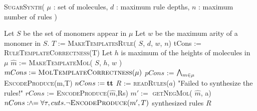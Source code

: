 \begin{algorithm}[t]
  \caption{ \textsc{SugarSynth}( $\mu$ : set of molecules, $d$ : maximum rule depths, $n$ : maximum number of rules )}
  \label{alg:sugar-synth}
  \begin{algorithmic}[1]
  \State Let $S$ be the set of monomers appear in $\mu$
  \State Let $w$ be the maximum arity of a monomer in $S$.
  \State $T$ := \textsc{MakeTemplatesRule}( $S$, $d$, $w$, $n$)
  \label{line:createRtemp}
  \State tCons := \textsc{RuleTemplateCorrectness}(T)
  \label{line:ruleCorr}
  \State Let $h$ is maximum of the heights of molecules in $\mu$
  \State $\hat{m}$ := \textsc{MakeTemplateMol}( $S$, $h$, $w$ )
  \label{line:createMtemp}
  \State $mCons := \textsc{MolTemplateCorrectness}(\mu)$
  \label{line:molCorr}
  \State $pCons$ := $\bigwedge_{m \in \mu}$ \textsc{EncodeProduce}(m,T)
    \label{line:molenc}
  \State $nCons := \mathbf{tt}$
  \While{$\ltrue$}
    \label{line:posModel}
    \State $R$ := \textsc{readRules}($a$)
    \label{line:getR}
    \Else
       \State \Return "Failed to synthesize the rules!"
    \EndIf
    \State $rCons$ := \textsc{EncodeProduce}($\hat{m}$,Rs)
    \label{line:consNewR}
        \label{line:negModel}
        \State $m' :=$ \textsc{getNegMol}( $\hat{m}$, a)
        \State $nCons \mathrel{:\hspace{-3pt}\land\hspace{-3pt}=} \forall \tau,cuts. \lnot \textsc{EncodeProduce}(m',T)$
        \label{line:negCons}
    \Else
       \State \Return synthesized rules $R$
    \EndIf

  \EndWhile
  \end{algorithmic}
\end{algorithm}


